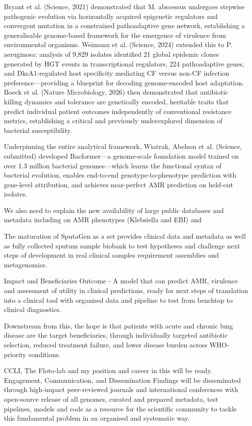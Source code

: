 Bryant et al. (Science, 2021) demonstrated that M. abscessus undergoes stepwise pathogenic evolution via horizontally acquired epigenetic regulators and convergent mutation in a constrained pathoadaptive gene network, establishing a generalisable genome-based framework for the emergence of virulence from environmental organisms. Weimann et al. (Science, 2024) extended this to P. aeruginosa: analysis of 9,829 isolates identified 21 global epidemic clones generated by HGT events in transcriptional regulators, 224 pathoadaptive genes, and DksA1-regulated host specificity mediating CF versus non-CF infection preference—providing a blueprint for decoding genome-encoded host adaptation. Boeck et al. (Nature Microbiology, 2026) then demonstrated that antibiotic killing dynamics and tolerance are genetically encoded, heritable traits that predict individual patient outcomes independently of conventional resistance metrics, establishing a critical and previously underexplored dimension of bacterial susceptibility. 

Underpinning the entire analytical framework, Wiatrak, Abelson et al. (Science, submitted) developed Bacformer—a genome-scale foundation model trained on over 1.3 million bacterial genomes—which learns the functional syntax of bacterial evolution, enables end-to-end genotype-to-phenotype prediction with gene-level attribution, and achieves near-perfect AMR prediction on held-out isolates. 

We also need to explain the new availability of large public databases and metadata including on AMR phenotypes (Klebsiella and EBI) and 

The maturation of SputaGen as a set provides clinical data and metadata as well as fully collected sputum sample biobank to test hypotheses and challenge next steps of development in real clinical samples requirement assemblies and metagenomics. 


Impact and Beneficiaries
Outcome - A model that can predict AMR, virulence and assessment of utility in clinical predictions, ready for next steps of translation into a clinical tool with organised data and pipeline to test from benchtop to clinical diagnostics.  

Downstream from this, the hope is that patients with acute and chronic lung disease are the target beneficiaries, through individually targeted antibiotic selection, reduced treatment failure, and lower disease burden across WHO-priority conditions. 

CCLI, The Floto-lab and my position and career in this will be ready. 
Engagement, Communication, and Dissemination
Findings will be disseminated through high-impact peer-reviewed journals and international conferences with open-source release of all genomes, curated and prepared metadata, test pipelines, models and code as a resource for the scientific community to tackle this fundamental problem in an organised and systematic way. 

